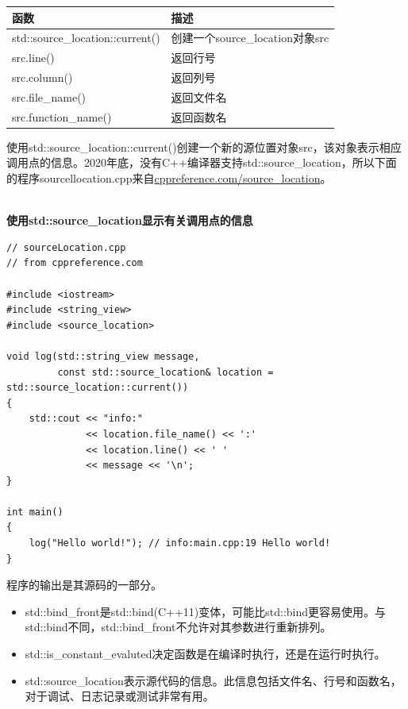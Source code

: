 \begin{table}[H]
\centering
\begin{tabular}{ll}
\textbf{函数}                & \textbf{描述}                      \\ \hline
std::source\_location::current() & 创建一个source\_location对象src \\
src.line()                       & 返回行号                   \\
src.column()                     & 返回列号                 \\
src.file\_name()                 & 返回文件名                     \\
src.function\_name()             & 返回函数名                
\end{tabular}
\end{table}

使用std::source\_location::current()创建一个新的源位置对象src，该对象表示相应调用点的信息。2020年底，没有C++编译器支持std::source\_location，所以下面的程序sourcellocation.cpp来自\href{https://en.cppreference.com/w/cpp/utility/source_location}{cppreference.com/source\_location}。

\hspace*{\fill} \\ %
\noindent
\textbf{使用std::source\_location显示有关调用点的信息}
\begin{lstlisting}[style=styleCXX]
// sourceLocation.cpp
// from cppreference.com

#include <iostream>
#include <string_view>
#include <source_location>

void log(std::string_view message,
		 const std::source_location& location = std::source_location::current())
{
	std::cout << "info:"
			  << location.file_name() << ':'
			  << location.line() << ' '
			  << message << '\n';
}

int main()
{
	log("Hello world!"); // info:main.cpp:19 Hello world!
}
\end{lstlisting}

程序的输出是其源码的一部分。

\begin{tcolorbox}[breakable,enhanced jigsaw,colback=mygreen!5!white,colframe=mygreen!75!black,title={总结}]

\begin{itemize}
\item 
std::bind\_front是std::bind(C++11)变体，可能比std::bind更容易使用。与std::bind不同，std::bind\_front不允许对其参数进行重新排列。

\item 
std::is\_constant\_evaluted决定函数是在编译时执行，还是在运行时执行。

\item 
std::source\_location表示源代码的信息。此信息包括文件名、行号和函数名，对于调试、日志记录或测试非常有用。
\end{itemize}

\end{tcolorbox}








